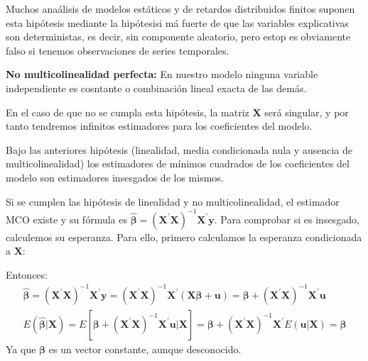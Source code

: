 Muchos ana\'alisis de modelos est\'aticos y de retardos distribuidos finitos suponen esta hip\'otesis mediante la hip\'otesisi m\'a fuerte de que las variables explicativas son deterministas, es decir, sin componente aleatorio, pero estop es obviamente falso si tenemos observaciones de series temporales.

\begin{hipotesis}
\textbf{No multicolinealidad perfecta:} En nuestro modelo ninguna variable independiente es cosntante o combinaci\'on lineal exacta de las dem\'as.
\end{hipotesis}

En el caso de que no se cumpla esta hip\'otesis, la matriz $\boldsymbol{X}$ ser\'a singular, y por tanto tendremos infinitos estimadores para los coeficientes del modelo.

\begin{teorema}
Bajo las anteriores hip\'otesis (linealidad, media condicionada nula y ausencia de multicolinealidad) los estimadores de m\'inimos cuadrados de los coeficientes del modelo son estimadores insesgados de los mismos.
\end{teorema}

Si se cumplen las hip\'otesis de linealidad y no multicolinealidad, el estimador MCO existe y su f\'ormula es $\hat{\boldsymbol{\beta}}=\left(\boldsymbol{X}^{\prime}\boldsymbol{X}\right)^{-1}\boldsymbol{X}^{\prime}\boldsymbol{y}$. Para comprobar si es insesgado, calculemos su esperanza. Para ello, primero calculamos la esperanza condicionada a  $\boldsymbol{X}$:

Entonces: 
\begin{equation*}
\begin{array}{c}
\hat{\boldsymbol{\beta}}=\left(\boldsymbol{X}^{\prime}\boldsymbol{X}\right)^{-1}\boldsymbol{X}^{\prime}\boldsymbol{y}=\left(\boldsymbol{X}^{\prime}\boldsymbol{X}\right)^{-1}\boldsymbol{X}^{\prime}\left(\boldsymbol{X\beta}+\boldsymbol{u}\right)=\boldsymbol{\beta}+\left(\boldsymbol{X}^{\prime}\boldsymbol{X}\right)^{-1}\boldsymbol{X}^{\prime}\boldsymbol{u}\\
E\left(\hat{\boldsymbol{\beta}}|\boldsymbol{X}\right)=E\left[\boldsymbol{\beta}+\left(\boldsymbol{X}^{\prime}\boldsymbol{X}\right)^{-1}\boldsymbol{X}^{\prime}\boldsymbol{u}|\boldsymbol{X}\right]=\boldsymbol{\beta}+\left(\boldsymbol{X}^{\prime}\boldsymbol{X}\right)^{-1}\boldsymbol{X}^{\prime}E\left(\boldsymbol{u}|\boldsymbol{X}\right)=\boldsymbol{\beta}
\end{array}
\end{equation*}
Ya que $\boldsymbol{\beta}$ es un vector constante, aunque desconocido.

